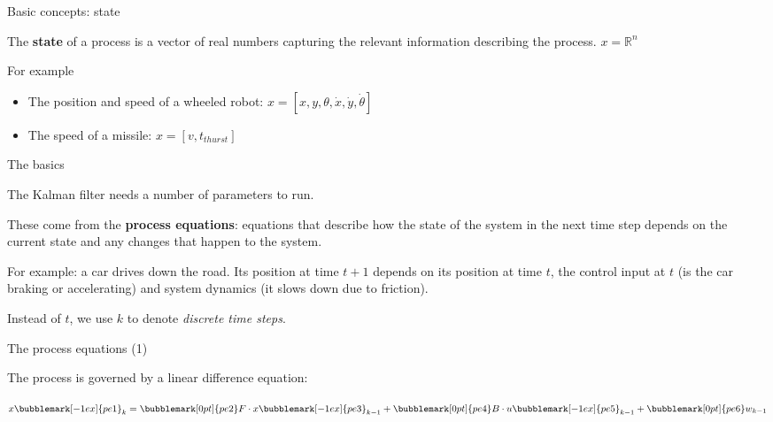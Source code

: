 \documentclass[compress]{beamer}
\begin{document}
\begin{frame}{Basic concepts: state}

The \textbf{state} of a process is a vector of real numbers capturing
    the relevant information describing the process. $x = \mathbb{R}^n$

For example

\begin{itemize}
    \item The position and speed of a wheeled robot: $x=[x, y, \theta, \dot{x}, \dot{y}, \dot{\theta}]$
    \item The speed of a missile: $x=[v, t_{thurst}]$
\end{itemize}

\end{frame}

\begin{frame}{The basics}

The Kalman filter needs a number of parameters to run.

These come from the \textbf{process equations}: equations that describe
how the state of the system in the next time step depends on the
current state and any changes that happen to the system.

\pause

For example: a car drives down the road. Its position at time
$t+1$ depends on its position at time $t$, the control input
at $t$ (is the car braking or accelerating) and system dynamics
(it slows down due to friction).

\pause

    Instead of $t$, we use $k$ to denote \emph{discrete time steps}.

\end{frame}

\begin{frame}{The process equations (1)}

    The process is governed by a linear difference equation:

    \vspace{4em}

    \Huge\centering
    $x\bubblemark[-1ex]{pe1}_k = \bubblemark[0pt]{pe2}F \cdot x\bubblemark[-1ex]{pe3}_{k-1} + \bubblemark[0pt]{pe4}B \cdot u\bubblemark[-1ex]{pe5}_{k-1} + \bubblemark[0pt]{pe6}w_{k-1}$


\end{frame}
\end{document}
